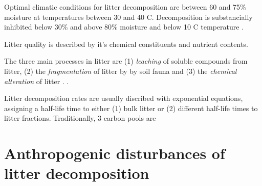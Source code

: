 Optimal climatic conditions for litter decomposition are between 60 and 75\% moisture at temperatures between 30 and 40 \textdegree C. Decomposition is substancially inhibited below 30\% and above 80\% moisture and below 10 \textdegree C temperature \citep{Prescott2010}. 

Litter quality is described by it's chemical constituents and nutrient contents. 

The three main processes in litter are (1) \emph{leaching} of soluble compounds from litter, (2) the \emph{fragmentation} of litter by by soil fauna and (3) the \emph{chemical alteration} of litter \citep[pp. 152f]{Chapin2002}. .

Litter decomposition rates are usually discribed with exponential equations, assigning a half-life time to either (1) bulk litter or (2) different half-life times to litter fractions. Traditionally, 3 carbon pools are 
\cite{Berg1980}

\section{Anthropogenic disturbances of litter decomposition}

